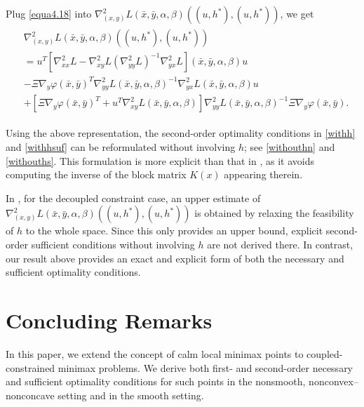 \documentclass[11pt]{article}
\numberwithin{equation}{section}
\begin{document}
{Plug \eqref{equa4.18} into $\nabla^2_{(x,y)} L(\bar x,\bar y,\alpha,\beta)((u,h^*),(u,h^*))$, we get
\begin{eqnarray*}
\begin{aligned}
&\nabla^2_{(x,y)} L(\bar x,\bar y,\alpha,\beta)((u,h^*),(u,h^*))\\
& =u^T [\nabla_{xx}^2 L -\nabla_{xy}^2 L(\nabla_{yy}^2 L)^{-1}\nabla_{yx}^2 L](\bar x,\bar y,\alpha,\beta) u \\
& - \Xi\nabla_y \varphi (\bar x,\bar y)^T\nabla_{yy}^2 L(\bar x,\bar y,\alpha,\beta)^{-1}\nabla_{yx}^2 L(\bar x,\bar y,\alpha,\beta)u\\
&+ \left[\Xi\nabla_y \varphi (\bar x,\bar y)^T + u^T \nabla_{xy}^2 L(\bar x,\bar y,\alpha,\beta) \right] \nabla_{yy}^2 L(\bar x,\bar y,\alpha,\beta)^{-1} \Xi \nabla_y \varphi (\bar x,\bar y) .
\end{aligned}
\end{eqnarray*}

Using the above representation, the second-order optimality conditions in \eqref{withh} and \eqref{withhsuf} can be reformulated without involving \(h\); see \eqref{withouthn} and \eqref{withouths}. This formulation is more explicit than that in \cite[Theorem 3.1, equation (3.7)  and Theorem 3.2]{DaiZh-2020}, as it avoids computing the inverse of the block matrix \(K(x)\) appearing therein.


{ In \cite[Corollary 5.1]{Ma2023}, for the decoupled constraint case, an upper estimate of   $\nabla^2_{(x,y)} L(\bar x,\bar y,\alpha,\beta)((u,h^*),(u,h^*))$ is obtained by relaxing the feasibility of \(h\) to the whole space. Since this only provides an upper bound, explicit second-order sufficient conditions without involving \(h\) are not derived there. In contrast, our result above provides an exact and explicit form of both the necessary and sufficient optimality conditions.}  



\section{Concluding Remarks}\label{concl}
In this paper, we extend the concept of calm local minimax points to coupled-constrained minimax problems. We derive both first- and second-order necessary and sufficient optimality conditions for such points in the nonsmooth, nonconvex–nonconcave setting and in the smooth setting.




}
\end{document}
